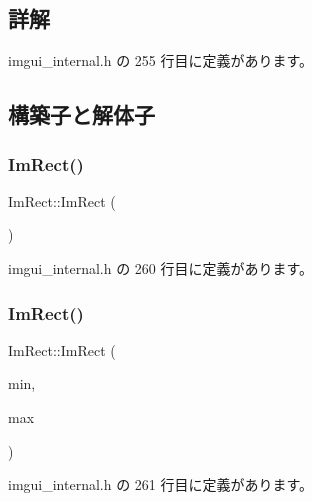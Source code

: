 \subsection{詳解}


 imgui\+\_\+internal.\+h の 255 行目に定義があります。



\subsection{構築子と解体子}
\mbox{\label{struct_im_rect_a57399f36758ed3eb1eb762143401ff54}} 
\subsubsection{\texorpdfstring{Im\+Rect()}{ImRect()}\hspace{0.1cm}{\footnotesize\ttfamily [1/4]}}
{\footnotesize\ttfamily Im\+Rect\+::\+Im\+Rect (\begin{DoxyParamCaption}{ }\end{DoxyParamCaption})\hspace{0.3cm}{\ttfamily [inline]}}



 imgui\+\_\+internal.\+h の 260 行目に定義があります。

\mbox{\label{struct_im_rect_a2f0ff273434bfd9d22bb699fd7a63a1f}} 
\subsubsection{\texorpdfstring{Im\+Rect()}{ImRect()}\hspace{0.1cm}{\footnotesize\ttfamily [2/4]}}
{\footnotesize\ttfamily Im\+Rect\+::\+Im\+Rect (\begin{DoxyParamCaption}\item[{const \mbox{\hyperlink{struct_im_vec2}{Im\+Vec2}} \&}]{min,  }\item[{const \mbox{\hyperlink{struct_im_vec2}{Im\+Vec2}} \&}]{max }\end{DoxyParamCaption})\hspace{0.3cm}{\ttfamily [inline]}}



 imgui\+\_\+internal.\+h の 261 行目に定義があります。

